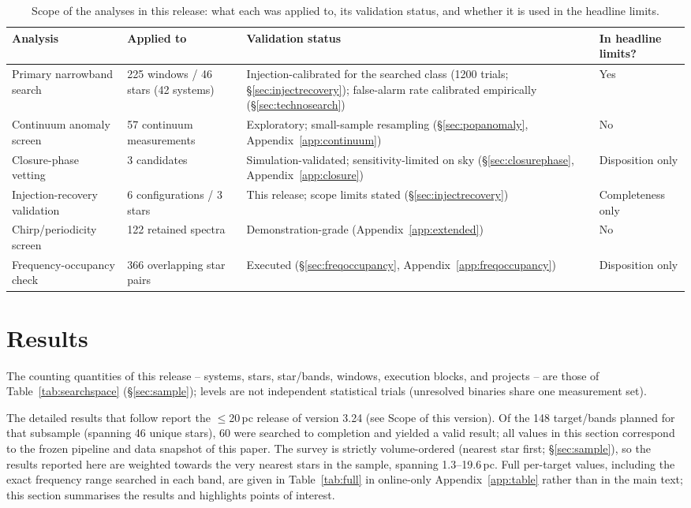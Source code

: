 \documentclass{openjournal}
\begin{document}
\begin{table}
\centering
\small
\caption{Scope of the analyses in this release: what each was applied
to, its validation status, and whether it is used in the headline
limits.}
\label{tab:supp}
\begin{tabular}{@{}p{}p{}p{}p{}@{}}
\toprule
Analysis & Applied to & Validation status & In headline limits? \\
\midrule
Primary narrowband search & 225 windows / 46 stars (42 systems) &
Injection-calibrated for the searched class (1200 trials;
\S\ref{sec:injectrecovery}); false-alarm rate calibrated empirically
(\S\ref{sec:technosearch}) & Yes \\
Continuum anomaly screen & 57 continuum measurements &
Exploratory; small-sample resampling (\S\ref{sec:popanomaly},
Appendix~\ref{app:continuum}) & No \\
Closure-phase vetting & 3 candidates & Simulation-validated;
sensitivity-limited on sky (\S\ref{sec:closurephase},
Appendix~\ref{app:closure}) & Disposition only \\
Injection-recovery validation & 6 configurations / 3 stars &
This release; scope limits stated (\S\ref{sec:injectrecovery}) &
Completeness only \\
Chirp/periodicity screen & 122 retained spectra & Demonstration-grade
(Appendix~\ref{app:extended}) & No \\
Frequency-occupancy check & 366 overlapping star pairs & Executed
(\S\ref{sec:freqoccupancy}, Appendix~\ref{app:freqoccupancy}) &
Disposition only \\
\bottomrule
\end{tabular}
\end{table}

\section{Results}
\label{sec:results}

The counting quantities of this release -- systems, stars,
star/bands, windows, execution blocks, and projects -- are those of
Table~\ref{tab:searchspace} (\S\ref{sec:sample}); levels are not
independent statistical trials (unresolved binaries share one
measurement set).

The detailed results that follow report the $\le$20\,pc release of
version 3.24 (see Scope of this version). Of the 148 target/bands
planned for that subsample (spanning 46 unique stars), 60 were searched to
completion and yielded a valid result; all values in this section
correspond to the frozen pipeline and data snapshot of this paper. The survey is strictly volume-ordered (nearest star first;
\S\ref{sec:sample}), so the results reported here are weighted towards
the very nearest stars in the sample, spanning 1.3--19.6\,pc. Full
per-target values, including the exact frequency range searched in each
band, are given in Table~\ref{tab:full} in online-only Appendix~\ref{app:table}
rather than in the main text; this section summarises the results and
highlights points of interest.
\end{document}
